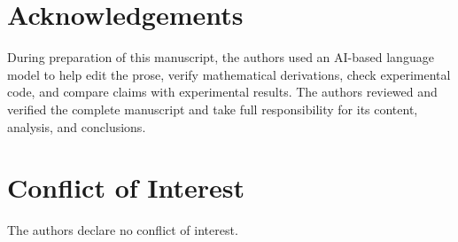 \documentclass[11pt]{article}
\begin{document}
\section*{Acknowledgements}

During preparation of this manuscript, the authors used an AI-based language model to help edit the prose, verify mathematical derivations, check experimental code, and compare claims with experimental results. The authors reviewed and verified the complete manuscript and take full responsibility for its content, analysis, and conclusions.

\section*{Conflict of Interest}

The authors declare no conflict of interest.





\end{document}
